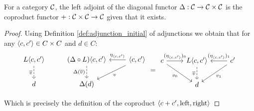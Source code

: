 \begin{theorem}
  For a category $\mathcal{C}$, the left adjoint of the diagonal functor $\Delta: \mathcal{C}\to
  \mathcal{C}\times \mathcal{C}$ is the coproduct functor $+:\mathcal{C}\times \mathcal{C}\to \mathcal{C}$ given that it
  exists.

  \begin{proof}
    Using Definition \ref{def:adjunction_initial} of adjunctions we obtain that
    for any $\langle c, c'\rangle\in C\times C$ and $d\in C$:
    \[\begin{tikzcd}[ampersand replacement=\&]
      {L\<c, c'\>} \& {(\Delta\circ L)\<c, c'\>} \& {\<c, c'\>} \\
      d \& {\Delta(d)}
      \arrow["{\overline{v}}"', dashed, from=1-1, to=2-1]
      \arrow["{\Delta(\overline{v})}"', dashed, from=1-2, to=2-2]
      \arrow["{\eta_{\<c,c'\>}}"', from=1-3, to=1-2]
      \arrow["v", from=1-3, to=2-2]
    \end{tikzcd}
    =
    \begin{tikzcd}[ampersand replacement=\&]
      c \& {L\<c, c'\>} \& {c'} \\
      \& d
      \arrow["{\overline{v}}"', dashed, from=1-2, to=2-2]
      \arrow["{(\eta_{\<c,c'\>})_1}"', from=1-3, to=1-2]
      \arrow["{v_1}", from=1-3, to=2-2]
      \arrow["{(\eta_{\<c,c'\>})_0}", from=1-1, to=1-2]
      \arrow["{v_0}"', from=1-1, to=2-2]
    \end{tikzcd}\]

    Which is precisely the definition of the coproduct $\langle c+c',\mathrm{left},
    \mathrm{right}\rangle$
  \end{proof}
\end{theorem}

